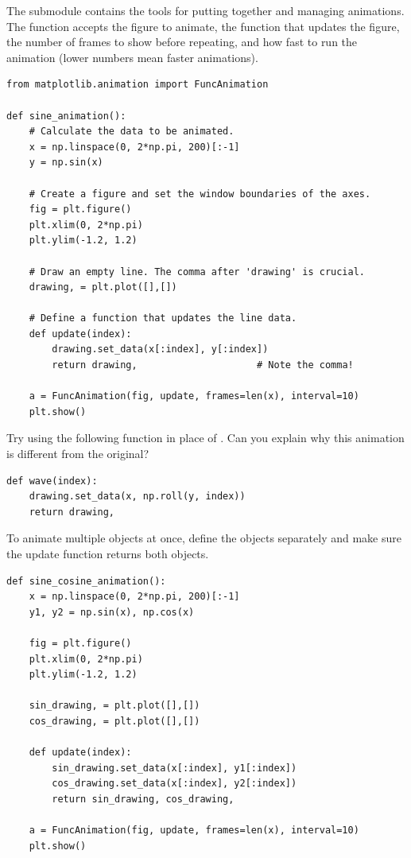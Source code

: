 The submodule  contains the tools for putting together and managing animations.
The function  accepts the figure to animate, the function that updates the figure, the number of frames to show before repeating, and how fast to run the animation (lower numbers mean faster animations).

\begin{lstlisting}
from matplotlib.animation import FuncAnimation

def sine_animation():
    # Calculate the data to be animated.
    x = np.linspace(0, 2*np.pi, 200)[:-1]
    y = np.sin(x)

    # Create a figure and set the window boundaries of the axes.
    fig = plt.figure()
    plt.xlim(0, 2*np.pi)
    plt.ylim(-1.2, 1.2)

    # Draw an empty line. The comma after 'drawing' is crucial.
    drawing, = plt.plot([],[])

    # Define a function that updates the line data.
    def update(index):
        drawing.set_data(x[:index], y[:index])
        return drawing,                     # Note the comma!

    a = FuncAnimation(fig, update, frames=len(x), interval=10)
    plt.show()
\end{lstlisting}

Try using the following function in place of .
Can you explain why this animation is different from the original?

\begin{lstlisting}
def wave(index):
    drawing.set_data(x, np.roll(y, index))
    return drawing,
\end{lstlisting}

To animate multiple objects at once, define the objects separately and make sure the update function returns both objects.

\begin{lstlisting}
def sine_cosine_animation():
    x = np.linspace(0, 2*np.pi, 200)[:-1]
    y1, y2 = np.sin(x), np.cos(x)

    fig = plt.figure()
    plt.xlim(0, 2*np.pi)
    plt.ylim(-1.2, 1.2)

    sin_drawing, = plt.plot([],[])
    cos_drawing, = plt.plot([],[])

    def update(index):
        sin_drawing.set_data(x[:index], y1[:index])
        cos_drawing.set_data(x[:index], y2[:index])
        return sin_drawing, cos_drawing,

    a = FuncAnimation(fig, update, frames=len(x), interval=10)
    plt.show()
\end{lstlisting}

